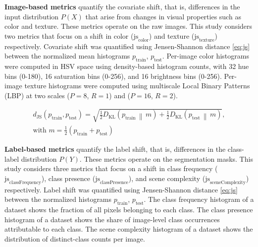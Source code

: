 \documentclass[conference]{IEEEtran}
\begin{document}
\textbf{Image-based metrics} quantify the covariate shift, that is, differences in the input distribution $P(X)$ that arise from changes in visual properties such as color and texture. These metrics operate on the raw images. This study considers two metrics that focus on a shift in color ($\text{js}_{\text{color}}$) and texture ($\text{js}_{\text{texture}}$) respectively. Covariate shift was quantified using Jensen-Shannon distance \eqref{eq:js} between the normalized mean histograms $p_{\text{train}}$, $p_{\text{test}}$. Per-image color histograms were computed in HSV space using density-based histogram counts, with 32 hue bins (0-180), 16 saturation bins (0-256), and 16 brightness bins (0-256). Per-image texture histograms were computed using multiscale Local Binary Patterns (LBP) at two scales ($P=8$, $R=1$) and ($P=16$, $R=2$).

\begin{equation}
\label{eq:js}
\begin{split}
d_{\text{JS}}(p_{\text{train}}, p_{\text{test}})
= \sqrt{
\frac{1}{2} D_{\text{KL}}\!\left( p_{\text{train}} \,\middle\|\, m \right)
+
\frac{1}{2} D_{\text{KL}}\!\left( p_{\text{test}} \,\middle\|\, m \right)
}, \\
\text{with } m = \frac{1}{2}\left(p_{\text{train}} + p_{\text{test}}\right)
\end{split}
\end{equation}

\textbf{Label-based metrics} quantify the label shift, that is, differences in the class-label distribution $P(Y)$. These metrics operate on the segmentation masks. This study considers three metrics that focus on a shift in class frequency ($\text{js}_{\text{classFrequency}}$), class presence ($\text{js}_{\text{classPresence}}$), and scene complexity ($\text{js}_{\text{sceneComplexity}}$) respectively. Label shift was quantified using Jensen-Shannon distance \eqref{eq:js} between the normalized histograms $p_{\text{train}}$, $p_{\text{test}}$. The class frequency histogram of a dataset shows the fraction of all pixels belonging to each class. The class presence histogram of a dataset shows the share of image-level class occurrences attributable to each class. The scene complexity histogram of a dataset shows the distribution of distinct-class counts per image.
\end{document}
